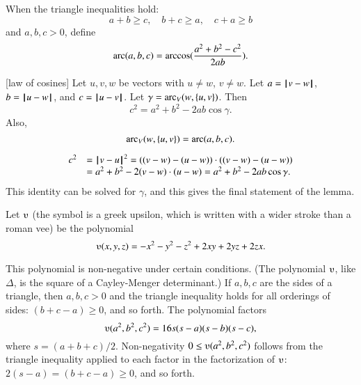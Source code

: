 
\begin{definition}[arc]
When the triangle inequalities hold:
$$
a + b \ge c,\quad b + c \ge a, \quad c+a \ge b
$$
and $a,b,c >0$, define
 $$\operatorname{arc}(a,b,c) = \arccos(\frac{a^2 + b^2 - c^2}{2 a b}).$$
\end{definition}

\begin{lemma}[law of cosines]
Let $u,v,w$ be vectors with $u\ne w$, $v\ne w$.  Let $a
    = {\hskip0.1em|\hskip-0.15em|\hskip0.1em}v  -  w{\hskip0.1em|\hskip-0.15em|\hskip0.1em}$, $b = {\hskip0.1em|\hskip-0.15em|\hskip0.1em}u  -  w{\hskip0.1em|\hskip-0.15em|\hskip0.1em}$, and $c = {\hskip0.1em|\hskip-0.15em|\hskip0.1em}u  -  v{\hskip0.1em|\hskip-0.15em|\hskip0.1em}$.
    Let $\gamma=\operatorname{arc}_V(w,\{u,v\})$.    Then
        $$c^2 = a^2 + b^2 - 2 a b \cos\gamma.$$
Also,
$$
\operatorname{arc}_V(w,\{u,v\})= \operatorname{arc}(a,b,c).
$$

\end{lemma}
\begin{proved}
    $$\begin{array}{lll}c^2 &= {\hskip0.1em|\hskip-0.15em|\hskip0.1em}v  -  u{\hskip0.1em|\hskip-0.15em|\hskip0.1em}^2 = ((v - w) - (u - w))\cdot ((v - w) - (u -
    w)) \\ &= a^2 + b^2 - 2 (v - w)\cdot (u - w) = a^2 +b ^2 - 2 a b
    \cos\gamma.
    \end{array}$$
This identity can be solved for $\gamma$, and this gives the final statement of the lemma.
\swallowed\end{proved}


\begin{definition}[$\ups$]\label{def:ups}
Let $\ups$ (the symbol is a greek upsilon, which is written with a
wider stroke than a roman vee) be the polynomial
    $$\ups(x,y,z) = -x^2 - y^2 - z^2 + 2 x y + 2 y z + 2 z x.$$
\end{definition}



This polynomial is non-negative under certain conditions. (The polynomial
$\ups$, like $\Delta$, 
is the square of a Cayley-Menger determinant.)  
If $a,b,c$ are the sides of a triangle, then $a,b,c>0$ and the triangle
inequality holds for all orderings of sides: $(b+c-a)\ge 0$, and so forth.
The polynomial factors
    $$\ups(a^2,b^2,c^2) = 16 s (s-a) (s-b) (s-c),$$
where $s = (a+b+c)/2$.
Non-negativity $0\le
\ups(a^2,b^2,c^2)$ follows from the triangle inequality applied to
each factor in the factorization of $\ups$: $2(s-a) = (b+c-a) \ge0$, and
so forth.  


